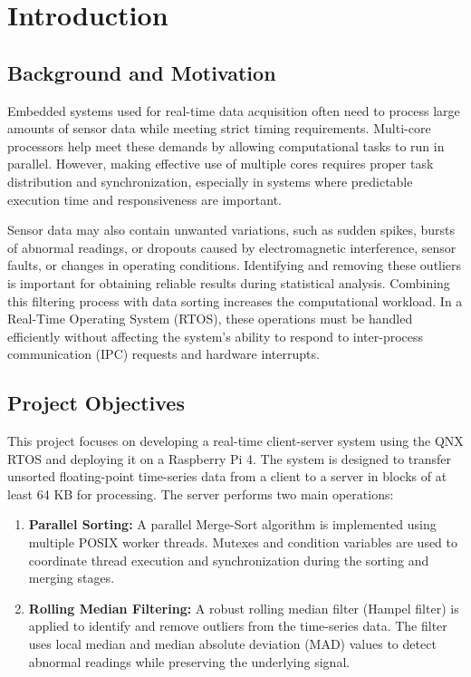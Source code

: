 \documentclass[12pt,a4paper,oneside]{report}
\begin{document}
\clearpage
{}
\setcounter{page}{1}

\chapter{Introduction}

\section{Background and Motivation}

Embedded systems used for real-time data acquisition often need to process large amounts of sensor data while meeting strict timing requirements. Multi-core processors help meet these demands by allowing computational tasks to run in parallel. However, making effective use of multiple cores requires proper task distribution and synchronization, especially in systems where predictable execution time and responsiveness are important.

Sensor data may also contain unwanted variations, such as sudden spikes, bursts of abnormal readings, or dropouts caused by electromagnetic interference, sensor faults, or changes in operating conditions. Identifying and removing these outliers is important for obtaining reliable results during statistical analysis. Combining this filtering process with data sorting increases the computational workload. In a Real-Time Operating System (RTOS), these operations must be handled efficiently without affecting the system's ability to respond to inter-process communication (IPC) requests and hardware interrupts.

\section{Project Objectives}

This project focuses on developing a real-time client-server system using the QNX RTOS and deploying it on a Raspberry Pi 4. The system is designed to transfer unsorted floating-point time-series data from a client to a server in blocks of at least 64 KB for processing. The server performs two main operations:

\begin{enumerate}
    \item \textbf{Parallel Sorting:} A parallel Merge-Sort algorithm is implemented using multiple POSIX worker threads. Mutexes and condition variables are used to coordinate thread execution and synchronization during the sorting and merging stages.

    \item \textbf{Rolling Median Filtering:} A robust rolling median filter (Hampel filter) is applied to identify and remove outliers from the time-series data. The filter uses local median and median absolute deviation (MAD) values to detect abnormal readings while preserving the underlying signal.
\end{enumerate}
\end{document}
